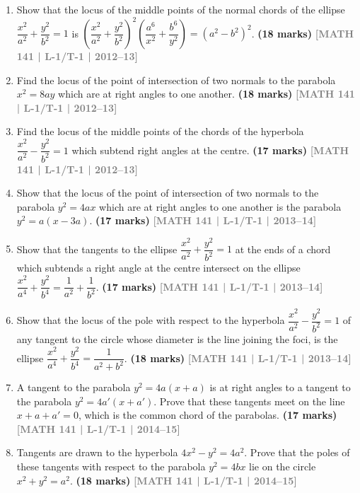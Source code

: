 \documentclass[12pt,a4paper]{article}
\newcommand{\yr}[1]{\hfill\textcolor{gray}{\small\textbf{[#1]}}}
\newcommand{\mk}[1]{\textcolor{orange!70!black}{\small\textbf{(#1 marks)}}}
\begin{document}
\begin{enumerate}
\item Show that the locus of the middle points of the normal chords of the ellipse $\dfrac{x^{2}}{a^{2}}+\dfrac{y^{2}}{b^{2}}=1$ is $\left(\dfrac{x^{2}}{a^{2}}+\dfrac{y^{2}}{b^{2}}\right)^{2}\!\left(\dfrac{a^{6}}{x^{2}}+\dfrac{b^{6}}{y^{2}}\right)=(a^{2}-b^{2})^{2}$.
\mk{18} \yr{MATH 141 | L-1/T-1 | 2012--13}

\item Find the locus of the point of intersection of two normals to the parabola $x^{2}=8ay$ which are at right angles to one another.
\mk{18} \yr{MATH 141 | L-1/T-1 | 2012--13}

\item Find the locus of the middle points of the chords of the hyperbola $\dfrac{x^{2}}{a^{2}}-\dfrac{y^{2}}{b^{2}}=1$ which subtend right angles at the centre.
\mk{17} \yr{MATH 141 | L-1/T-1 | 2012--13}

\item Show that the locus of the point of intersection of two normals to the parabola $y^{2}=4ax$ which are at right angles to one another is the parabola $y^{2}=a(x-3a)$.
\mk{17} \yr{MATH 141 | L-1/T-1 | 2013--14}

\item Show that the tangents to the ellipse $\dfrac{x^{2}}{a^{2}}+\dfrac{y^{2}}{b^{2}}=1$ at the ends of a chord which subtends a right angle at the centre intersect on the ellipse $\dfrac{x^{2}}{a^{4}}+\dfrac{y^{2}}{b^{4}}=\dfrac{1}{a^{2}}+\dfrac{1}{b^{2}}$.
\mk{17} \yr{MATH 141 | L-1/T-1 | 2013--14}

\item Show that the locus of the pole with respect to the hyperbola $\dfrac{x^{2}}{a^{2}}-\dfrac{y^{2}}{b^{2}}=1$ of any tangent to the circle whose diameter is the line joining the foci, is the ellipse $\dfrac{x^{2}}{a^{4}}+\dfrac{y^{2}}{b^{4}}=\dfrac{1}{a^{2}+b^{2}}$.
\mk{18} \yr{MATH 141 | L-1/T-1 | 2013--14}

\item A tangent to the parabola $y^{2}=4a(x+a)$ is at right angles to a tangent to the parabola $y^{2}=4a'(x+a')$. Prove that these tangents meet on the line $x+a+a'=0$, which is the common chord of the parabolas.
\mk{17} \yr{MATH 141 | L-1/T-1 | 2014--15}

\item Tangents are drawn to the hyperbola $4x^{2}-y^{2}=4a^{2}$. Prove that the poles of these tangents with respect to the parabola $y^{2}=4bx$ lie on the circle $x^{2}+y^{2}=a^{2}$.
\mk{18} \yr{MATH 141 | L-1/T-1 | 2014--15}


\end{enumerate}
\end{document}
